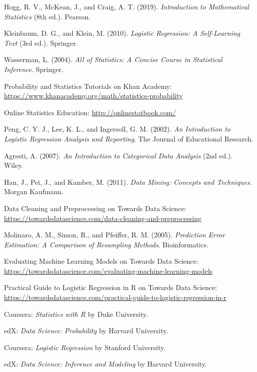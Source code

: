 \begin{thebibliography}{99}
 Hogg, R. V., McKean, J., and Craig, A. T. (2019). \textit{Introduction to Mathematical Statistics} (8th ed.). Pearson.

 Kleinbaum, D. G., and Klein, M. (2010). \textit{Logistic Regression: A Self-Learning Text} (3rd ed.). Springer.

 Wasserman, L. (2004). \textit{All of Statistics: A Concise Course in Statistical Inference}. Springer.

 Probability and Statistics Tutorials on Khan Academy: \url{https://www.khanacademy.org/math/statistics-probability}

 Online Statistics Education: \url{http://onlinestatbook.com/}

 Peng, C. Y. J., Lee, K. L., and Ingersoll, G. M. (2002). \textit{An Introduction to Logistic Regression Analysis and Reporting}. The Journal of Educational Research.

 Agresti, A. (2007). \textit{An Introduction to Categorical Data Analysis} (2nd ed.). Wiley.

 Han, J., Pei, J., and Kamber, M. (2011). \textit{Data Mining: Concepts and Techniques}. Morgan Kaufmann.

 Data Cleaning and Preprocessing on Towards Data Science: \url{https://towardsdatascience.com/data-cleaning-and-preprocessing}

 Molinaro, A. M., Simon, R., and Pfeiffer, R. M. (2005). \textit{Prediction Error Estimation: A Comparison of Resampling Methods}. Bioinformatics.

 Evaluating Machine Learning Models on Towards Data Science: \url{https://towardsdatascience.com/evaluating-machine-learning-models}

 Practical Guide to Logistic Regression in R on Towards Data Science: \url{https://towardsdatascience.com/practical-guide-to-logistic-regression-in-r}

 Coursera: \textit{Statistics with R} by Duke University.

 edX: \textit{Data Science: Probability} by Harvard University.

 Coursera: \textit{Logistic Regression} by Stanford University.

 edX: \textit{Data Science: Inference and Modeling} by Harvard University.


\end{thebibliography}
